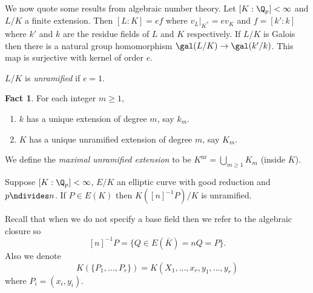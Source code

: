 \documentclass[a4paper]{article}
\theoremstyle{definition}
\newtheorem*{fact}{Fact}
\theoremstyle{theorem}
\begin{document}
We now quote some results from algebraic number theory. Let \([K: \Q_p] < \infty\) and \(L/K\) a finite extension. Then \([L: K] = ef\) where \(v_L|_{K^*} = e v_K\) and \(f = [k': k]\) where \(k'\) and \(k\) are the residue fields of \(L\) and \(K\) respectively. If \(L/K\) is Galois then there is a natural group homomorphism \(\gal(L/K) \to \gal(k'/k)\). This map is surjective with kernel of order \(e\).

\begin{definition}
  \(L/K\) is \emph{unramified} if \(e = 1\).
\end{definition}

\begin{fact}
  For each integer \(m \geq 1\),
  \begin{enumerate}
  \item \(k\) has a unique extension of degree \(m\), say \(k_m\).
  \item \(K\) has a unique unramified extension of degree \(m\), say \(K_m\).
  \end{enumerate}
\end{fact}

\begin{definition}
  We define the \emph{maximal unramified extension} to be \(K^{\mathrm{nr}} = \bigcup_{m \geq 1} K_m\) (inside \(\overline K\)).
\end{definition}

\begin{theorem}
  Suppose \([K: \Q_p] < \infty\), \(E/K\) an elliptic curve with good reduction and \(p \ndivides n\). If \(P \in E(K)\) then \(K([n]^{-1}P)/K\) is unramified.
\end{theorem}

Recall that when we do not specify a base field then we refer to the algebraic closure so
\[
  [n]^{-1}P = \{Q \in E(\overline K) = nQ = P\}.
\]
Also we denote
\[
  K(\{P_1, \dots, P_r\}) = K(X_1, \dots, x_r, y_1, \dots, y_r)
\]
where \(P_i = (x_i, y_i)\).
\end{document}
